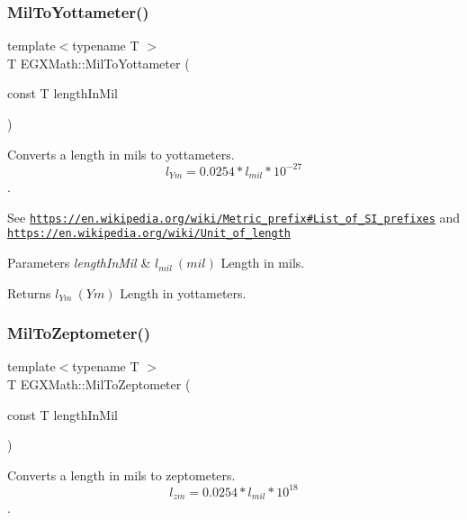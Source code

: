 \subsubsection{\texorpdfstring{Mil\+To\+Yottameter()}{MilToYottameter()}}
{\footnotesize\ttfamily template$<$typename T $>$ \\
T E\+G\+X\+Math\+::\+Mil\+To\+Yottameter (\begin{DoxyParamCaption}\item[{const T}]{length\+In\+Mil }\end{DoxyParamCaption})}



Converts a length in mils to yottameters. \[ l_{Ym}=0.0254* l_{mil} * 10^{-27} \]. 

See \href{https://en.wikipedia.org/wiki/Metric_prefix#List_of_SI_prefixes}{\tt https\+://en.\+wikipedia.\+org/wiki/\+Metric\+\_\+prefix\#\+List\+\_\+of\+\_\+\+S\+I\+\_\+prefixes} and \href{https://en.wikipedia.org/wiki/Unit_of_length}{\tt https\+://en.\+wikipedia.\+org/wiki/\+Unit\+\_\+of\+\_\+length} 
\begin{DoxyParams}{Parameters}
{\em length\+In\+Mil} & $ l_{mil}\ (mil)$ Length in mils. \\
\hline
\end{DoxyParams}
\begin{DoxyReturn}{Returns}
$ l_{Ym}\ (Ym)$ Length in yottameters. 
\end{DoxyReturn}
\mbox{\label{group___e_g_x_math-_conversions-_length_conversions-_imperial-_mil-_s_i_ga2f5d6fae48c67d44f71200ac8189246f}} 
\subsubsection{\texorpdfstring{Mil\+To\+Zeptometer()}{MilToZeptometer()}}
{\footnotesize\ttfamily template$<$typename T $>$ \\
T E\+G\+X\+Math\+::\+Mil\+To\+Zeptometer (\begin{DoxyParamCaption}\item[{const T}]{length\+In\+Mil }\end{DoxyParamCaption})}



Converts a length in mils to zeptometers. \[ l_{zm}=0.0254 * l_{mil} * 10^{18} \]. 


